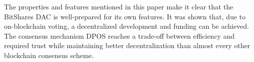 The properties and features mentioned in this paper make it clear that the
BitShares DAC is well-prepared for its own features. It was shown that, due to
on-blockchain voting, a decentralized development and funding can be achieved.
The consensus mechanism DPOS reaches a trade-off between efficiency and
required trust while maintaining better decentralization than almost every other
blockchain consensus scheme.
